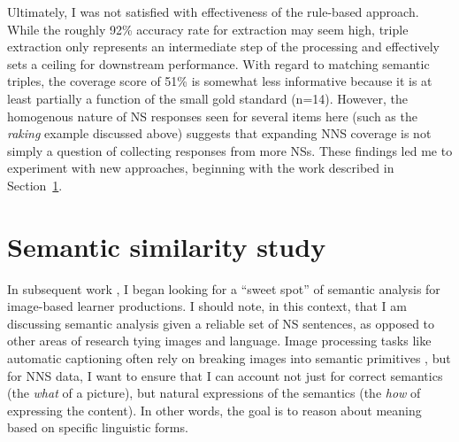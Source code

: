 Ultimately, I was not satisfied with effectiveness of the rule-based approach. While the roughly 92\% accuracy rate for extraction may seem high, triple extraction only represents an intermediate step of the processing and effectively sets a ceiling for downstream performance. With regard to matching semantic triples, the coverage score of 51\% is somewhat less informative because it is at least partially a function of the small gold standard (n=14). However, the homogenous nature of NS responses seen for several items here (such as the \textit{raking} example discussed above) suggests that expanding NNS coverage is not simply a question of collecting responses from more NSs. These findings led me to experiment with new approaches, beginning with the work described in Section~\ref{sec:2016work}.


\section{Semantic similarity study}
\label{sec:2016work}

In subsequent work \citep{king:dickinson:16}, I began looking for a ``sweet spot'' of
semantic analysis \citep[cf.][]{bailey:meurers:08} for image-based learner productions. I should note, in this context, that I am discussing semantic analysis given a reliable set of NS sentences, as opposed to other areas of research tying images and language. Image processing tasks like automatic captioning often rely on breaking images into semantic primitives \citep[see, e.g.,][and references therein]{ortiz:wolff:lapata:15}, but for NNS data, I want to ensure that I can account not just for correct semantics (the \emph{what} of a picture), but natural expressions of the semantics (the \emph{how} of expressing the content).  In other words, the goal is to reason about meaning based on specific linguistic forms.

